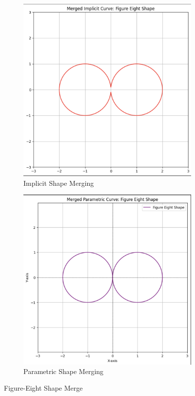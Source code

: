 \documentclass[10pt,a4paper]{article}
\begin{document}
\begin{figure}[H]
\centering
\begin{subfigure}[b]{0.20\textwidth}
    \centering
    \includegraphics[width=\textwidth]{VisualComputingReportResults/ImplicitShapeMerging}
    \caption{\small Implicit Shape Merging}
    \label{fig:cubic}
\end{subfigure}
\hspace{0.1\textwidth}
\begin{subfigure}[b]{0.20\textwidth}
    \centering
    \includegraphics[width=\textwidth]{VisualComputingReportResults/ParametricShapeMerging}
    \caption{\small Parametric Shape Merging}
    \label{fig:quartic}
\end{subfigure}
\caption{\small Figure-Eight Shape Merge}
\label{fig:bezier_curves}
\end{figure}
\end{document}
